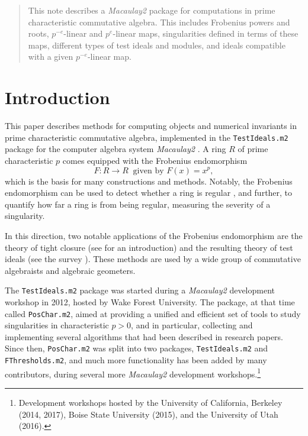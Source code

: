 \documentclass{amsart}
\begin{document}
\begin{abstract}
	This note describes a \emph{Macaulay2} package for computations in prime characteristic commutative algebra.  This includes Frobenius powers and roots, $p^{-e}$-linear and $p^{e}$-linear  maps,
  singularities defined in terms of these maps, different types of test ideals and modules, and ideals compatible with a given $p^{-e}$-linear map.
\end{abstract}




\maketitle

\section{Introduction}

This paper describes methods for computing objects and numerical invariants in prime characteristic commutative algebra, implemented in the \texttt{TestIdeals.m2} package for the computer algebra system \emph{Macaulay2} \cite{M2}.
A ring $R$ of prime characteristic $p$ comes equipped with the Frobenius endomorphism
\[ F: R \to R \ \text{ given by } F(x) =  x^p,\]
which is the basis for many constructions and methods.
Notably, the Frobenius endomorphism can be used to detect whether a ring is regular \cite{KunzCharacterizationsOfRegularLocalRings}, and further, to quantify how far a ring is from being regular, measuring the severity of a singularity.

In this direction, two notable applications of the Frobenius endomorphism are the theory of tight closure
(see \cite{HochsterHunekeTC1,HochsterFoundations} for an introduction)
and the resulting theory of test ideals
(see the survey \cite{SchwedeTuckerTestIdealSurvey}).  These methods are used by a wide group of commutative algebraists and algebraic geometers.

The \texttt{TestIdeals.m2} package was started during a \emph{Macaulay2} development workshop in 2012, hosted by Wake Forest University.
The package, at that time called \texttt{PosChar.m2}, aimed at providing a unified and efficient set of tools to study singularities in characteristic $p > 0$, and in particular, collecting and implementing several algorithms that had been described in research papers.
Since then, \texttt{PosChar.m2} was split into two packages, \texttt{TestIdeals.m2} and \texttt{FThresholds.m2}, and
much more functionality has been added by many contributors, during several more \emph{Macaulay2} development workshops.\footnote{Development workshops hosted by the University of California, Berkeley (2014, 2017), Boise State University (2015), and the University of Utah (2016).}
\end{document}
